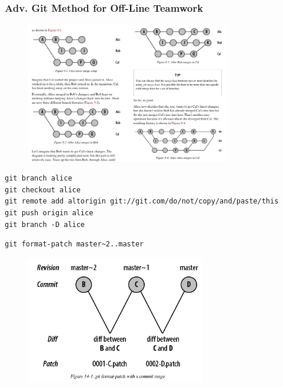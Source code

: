 \documentclass[hyperref={colorlinks=false},handout,10pt]{beamer}
\begin{document}
\begin{frame}
    \frametitle{Adv. Git Method for Off-Line Teamwork}
    \begin{figure}
        \begin{center}
            \includegraphics[width=0.8\textwidth]{images/gitmergeexample.png}
        \end{center}
    \end{figure}
    \begin{lstlisting}
git branch alice 
git checkout alice
git remote add altorigin git://git.com/do/not/copy/and/paste/this
git push origin alice
git branch -D alice
    \end{lstlisting}

    \begin{lstlisting}
git format-patch master~2..master
    \end{lstlisting}
    \begin{figure}
        \begin{center}
            \includegraphics[width=0.7\textwidth]{images/gitformatpatch.png}
        \end{center}
    \end{figure}
\end{frame}
\end{document}
